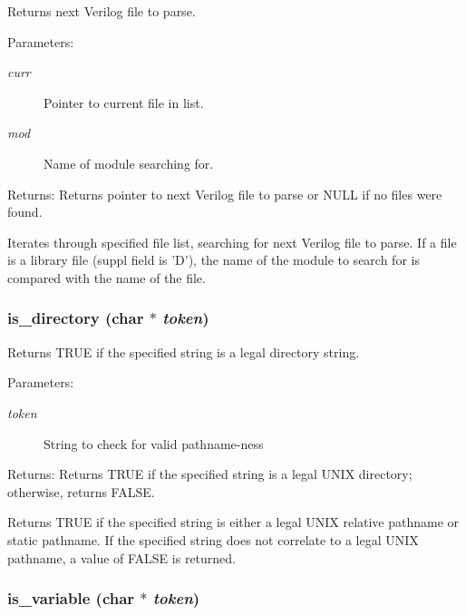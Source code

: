 Returns next Verilog file to parse. 

\begin{Desc}
\item[Parameters:]
\begin{description}
\item[{\em curr}]Pointer to current file in list. \item[{\em mod}]Name of module searching for.\end{description}
\end{Desc}
\begin{Desc}
\item[Returns:]Returns pointer to next Verilog file to parse or NULL if no files were found.\end{Desc}
Iterates through specified file list, searching for next Verilog file to parse. If a file is a library file (suppl field is 'D'), the name of the module to search for is compared with the name of the file. 
\subsubsection{ is\_\-directory (char $\ast$ {\em token})}\label{util_8h_a4}


Returns TRUE if the specified string is a legal directory string. 

\begin{Desc}
\item[Parameters:]
\begin{description}
\item[{\em token}]String to check for valid pathname-ness \end{description}
\end{Desc}
\begin{Desc}
\item[Returns:]Returns TRUE if the specified string is a legal UNIX directory; otherwise, returns FALSE.\end{Desc}
Returns TRUE if the specified string is either a legal UNIX relative pathname or static pathname. If the specified string does not correlate to a legal UNIX pathname, a value of FALSE is returned. 
\subsubsection{ is\_\-variable (char $\ast$ {\em token})}\label{util_8h_a3}


